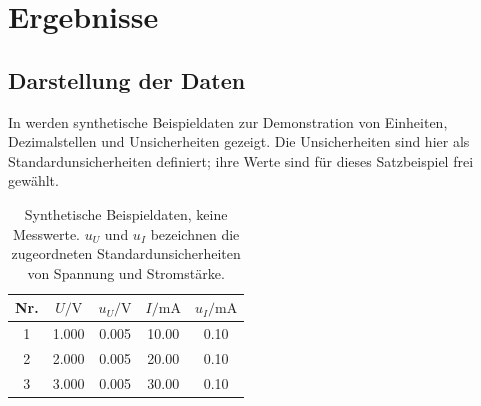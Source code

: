 \chapter{Ergebnisse}
\label{chap:results}

\section{Darstellung der Daten}
In  werden synthetische Beispieldaten zur Demonstration
von Einheiten, Dezimalstellen und Unsicherheiten gezeigt. Die Unsicherheiten
sind hier als Standardunsicherheiten definiert; ihre Werte sind für dieses
Satzbeispiel frei gewählt.
\begin{table}[htbp]
  \centering
  \caption[Synthetische Beispieldaten]{Synthetische Beispieldaten, keine
    Messwerte. $u_U$ und $u_I$ bezeichnen die zugeordneten
    Standardunsicherheiten von Spannung und Stromstärke.}
  \label{tab:example}
  \begin{tabular}{c S[table-format=1.3] S[table-format=1.3]
                    S[table-format=2.2] S[table-format=1.2]}
    \toprule
    Nr. & {$U/\unit{\volt}$} & {$u_U/\unit{\volt}$}
        & {$I/\unit{\milli\ampere}$} & {$u_I/\unit{\milli\ampere}$} \\
     & 1.000 & 0.005 & 10.00 & 0.10 \\
    2 & 2.000 & 0.005 & 20.00 & 0.10 \\
    3 & 3.000 & 0.005 & 30.00 & 0.10 \\
    \bottomrule
  \end{tabular}
\end{table}

